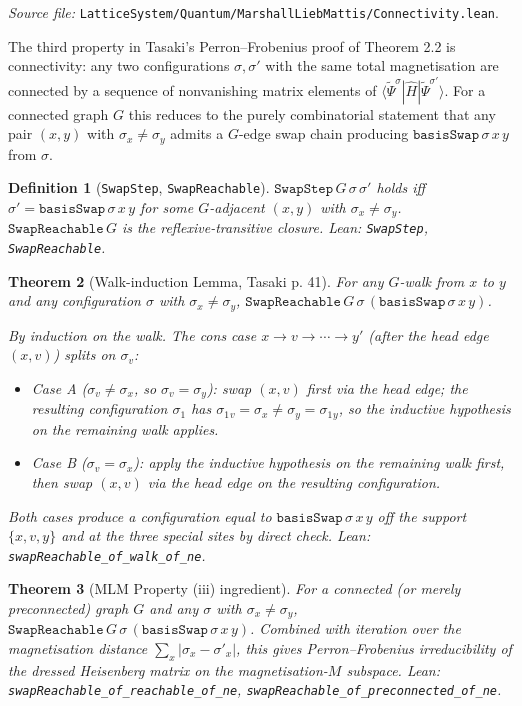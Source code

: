 \documentclass[a4paper,11pt]{article}
\newtheorem{theorem}{Theorem}
\newtheorem{definition}[theorem]{Definition}
\begin{document}
\emph{Source file:}
\texttt{LatticeSystem/Quantum/MarshallLiebMattis/Connectivity.lean}.

The third property in Tasaki's Perron--Frobenius proof of
Theorem 2.2 is connectivity: any two configurations
$\sigma, \sigma'$ with the same total magnetisation are connected
by a sequence of nonvanishing matrix elements of
$\langle\widetilde{\Psi}^\sigma|\hat H|\widetilde{\Psi}^{\sigma'}\rangle$.
For a connected graph $G$ this reduces to the purely combinatorial
statement that any pair $(x, y)$ with $\sigma_x \neq \sigma_y$
admits a $G$-edge swap chain producing
$\texttt{basisSwap}\,\sigma\,x\,y$ from $\sigma$.

\begin{definition}[\texttt{SwapStep}, \texttt{SwapReachable}]
\label{def:swap-step}
$\texttt{SwapStep}\,G\,\sigma\,\sigma'$ holds iff
$\sigma' = \texttt{basisSwap}\,\sigma\,x\,y$ for some $G$-adjacent
$(x, y)$ with $\sigma_x \neq \sigma_y$.
$\texttt{SwapReachable}\,G$ is the reflexive-transitive closure.
Lean: \texttt{SwapStep}, \texttt{SwapReachable}.
\end{definition}

\begin{theorem}[Walk-induction Lemma, Tasaki p. 41]
\label{thm:swap-walk}
For any $G$-walk from $x$ to $y$ and any configuration
$\sigma$ with $\sigma_x \neq \sigma_y$,
$\texttt{SwapReachable}\,G\,\sigma\,(\texttt{basisSwap}\,\sigma\,x\,y)$.

By induction on the walk. The cons case
$x \to v \to \cdots \to y'$ (after the head edge $(x, v)$) splits
on $\sigma_v$:
\begin{itemize}
\item Case A ($\sigma_v \neq \sigma_x$, so $\sigma_v = \sigma_y$):
  swap $(x, v)$ first via the head edge; the resulting
  configuration $\sigma_1$ has $\sigma_1{}_v = \sigma_x \neq
  \sigma_y = \sigma_1{}_y$, so the inductive hypothesis on the
  remaining walk applies.
\item Case B ($\sigma_v = \sigma_x$): apply the inductive
  hypothesis on the remaining walk first, then swap $(x, v)$
  via the head edge on the resulting configuration.
\end{itemize}
Both cases produce a configuration equal to
$\texttt{basisSwap}\,\sigma\,x\,y$ off the support
$\{x, v, y\}$ and at the three special sites by direct check.
Lean: \texttt{swapReachable\_of\_walk\_of\_ne}.
\end{theorem}

\begin{theorem}[MLM Property (iii) ingredient]
\label{thm:swap-reachable}
For a connected (or merely preconnected) graph $G$ and any
$\sigma$ with $\sigma_x \neq \sigma_y$,
$\texttt{SwapReachable}\,G\,\sigma\,(\texttt{basisSwap}\,\sigma\,x\,y)$.
Combined with iteration over the magnetisation distance
$\sum_x |\sigma_x - \sigma'_x|$, this gives Perron--Frobenius
irreducibility of the dressed Heisenberg matrix on the
magnetisation-$M$ subspace. Lean:
\texttt{swapReachable\_of\_reachable\_of\_ne},
\texttt{swapReachable\_of\_preconnected\_of\_ne}.
\end{theorem}
\end{document}
